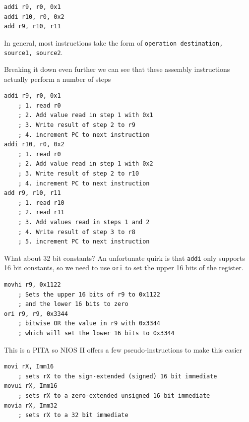 \documentclass[../notes.tex]{subfiles}
\begin{document}

\begin{listing}[H]
\begin{verbatim}
addi r9, r0, 0x1
addi r10, r0, 0x2
add r9, r10, r11
\end{verbatim}
\end{listing}

In general, most instructions take the form of \texttt{operation destination, source1, source2}.


Breaking it down even further we can see that these assembly instructions actually perform a number of steps

\begin{listing}[H]
\begin{verbatim}
addi r9, r0, 0x1
	; 1. read r0
	; 2. Add value read in step 1 with 0x1
	; 3. Write result of step 2 to r9
	; 4. increment PC to next instruction
addi r10, r0, 0x2
	; 1. read r0
	; 2. Add value read in step 1 with 0x2
	; 3. Write result of step 2 to r10
	; 4. increment PC to next instruction
add r9, r10, r11
	; 1. read r10
	; 2. read r11
	; 3. Add values read in steps 1 and 2
	; 4. Write result of step 3 to r8
	; 5. increment PC to next instruction
\end{verbatim}
\end{listing}


What about 32 bit constants? An unfortunate quirk is that \texttt{addi} only supports 16 bit constants, so we need to use \texttt{ori} to set the upper 16 bits of the register.


\begin{listing}[H]
\begin{verbatim}
movhi r9, 0x1122
	; Sets the upper 16 bits of r9 to 0x1122
	; and the lower 16 bits to zero
ori r9, r9, 0x3344
	; bitwise OR the value in r9 with 0x3344
	; which will set the lower 16 bits to 0x3344
\end{verbatim}
\end{listing}

This is a PITA so NIOS II offers a few pseudo-instructions to make this easier




\begin{listing}[H]
\begin{verbatim}
movi rX, Imm16
	; sets rX to the sign-extended (signed) 16 bit immediate
movui rX, Imm16
	; sets rX to a zero-extended unsigned 16 bit immediate
movia rX, Imm32
	; sets rX to a 32 bit immediate
\end{verbatim}
\end{listing}
\end{document}
